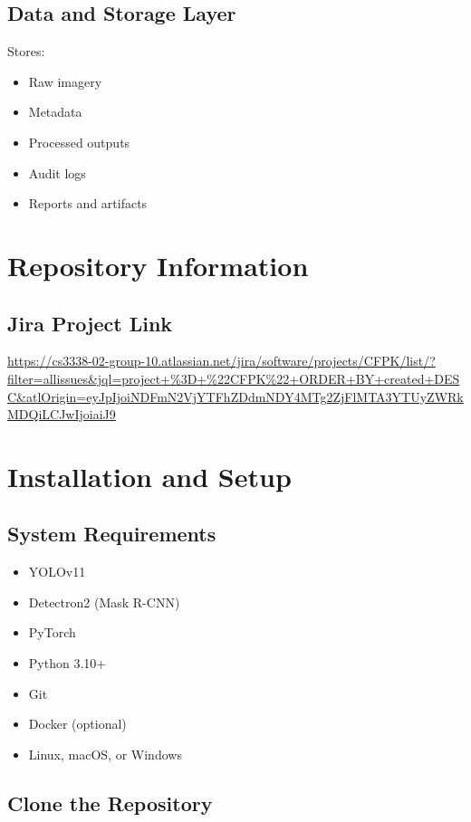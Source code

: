 \documentclass[12pt]{article}
\begin{document}
\subsection{Data and Storage Layer}
Stores:
\begin{itemize}
    \item Raw imagery
    \item Metadata
    \item Processed outputs
    \item Audit logs
    \item Reports and artifacts
\end{itemize}

\section{Repository Information}


\subsection{Jira Project Link}

\begin{center}
\url{https://cs3338-02-group-10.atlassian.net/jira/software/projects/CFPK/list/?filter=allissues&jql=project+%3D+%22CFPK%22+ORDER+BY+created+DESC&atlOrigin=eyJpIjoiNDFmN2VjYTFhZDdmNDY4MTg2ZjFlMTA3YTUyZWRkMDQiLCJwIjoiaiJ9}
\end{center}

\section{Installation and Setup}

\subsection{System Requirements}

\begin{itemize}
    \item YOLOv11
    \item Detectron2 (Mask R-CNN)
    \item PyTorch
    \item Python 3.10+
    \item Git
    \item Docker (optional)
    \item Linux, macOS, or Windows
\end{itemize}

\subsection{Clone the Repository}
\end{document}
